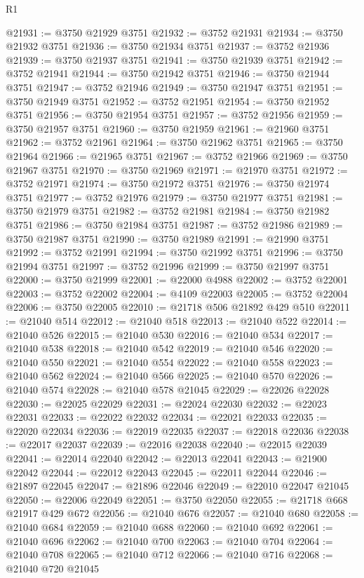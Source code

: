 \begin{lexlean}{R1}
\begin{coremodule}
@21931 := @3750 @21929 @3751
@21932 := @3752 @21931
@21934 := @3750 @21932 @3751
@21936 := @3750 @21934 @3751
@21937 := @3752 @21936
@21939 := @3750 @21937 @3751
@21941 := @3750 @21939 @3751
@21942 := @3752 @21941
@21944 := @3750 @21942 @3751
@21946 := @3750 @21944 @3751
@21947 := @3752 @21946
@21949 := @3750 @21947 @3751
@21951 := @3750 @21949 @3751
@21952 := @3752 @21951
@21954 := @3750 @21952 @3751
@21956 := @3750 @21954 @3751
@21957 := @3752 @21956
@21959 := @3750 @21957 @3751
@21960 := @3750 @21959
@21961 := @21960 @3751
@21962 := @3752 @21961
@21964 := @3750 @21962 @3751
@21965 := @3750 @21964
@21966 := @21965 @3751
@21967 := @3752 @21966
@21969 := @3750 @21967 @3751
@21970 := @3750 @21969
@21971 := @21970 @3751
@21972 := @3752 @21971
@21974 := @3750 @21972 @3751
@21976 := @3750 @21974 @3751
@21977 := @3752 @21976
@21979 := @3750 @21977 @3751
@21981 := @3750 @21979 @3751
@21982 := @3752 @21981
@21984 := @3750 @21982 @3751
@21986 := @3750 @21984 @3751
@21987 := @3752 @21986
@21989 := @3750 @21987 @3751
@21990 := @3750 @21989
@21991 := @21990 @3751
@21992 := @3752 @21991
@21994 := @3750 @21992 @3751
@21996 := @3750 @21994 @3751
@21997 := @3752 @21996
@21999 := @3750 @21997 @3751
@22000 := @3750 @21999
@22001 := @22000 @4988
@22002 := @3752 @22001
@22003 := @3752 @22002
@22004 := @4109 @22003
@22005 := @3752 @22004
@22006 := @3750 @22005
@22010 := @21718 @506 @21892 @429 @510
@22011 := @21040 @514
@22012 := @21040 @518
@22013 := @21040 @522
@22014 := @21040 @526
@22015 := @21040 @530
@22016 := @21040 @534
@22017 := @21040 @538
@22018 := @21040 @542
@22019 := @21040 @546
@22020 := @21040 @550
@22021 := @21040 @554
@22022 := @21040 @558
@22023 := @21040 @562
@22024 := @21040 @566
@22025 := @21040 @570
@22026 := @21040 @574
@22028 := @21040 @578 @21045
@22029 := @22026 @22028
@22030 := @22025 @22029
@22031 := @22024 @22030
@22032 := @22023 @22031
@22033 := @22022 @22032
@22034 := @22021 @22033
@22035 := @22020 @22034
@22036 := @22019 @22035
@22037 := @22018 @22036
@22038 := @22017 @22037
@22039 := @22016 @22038
@22040 := @22015 @22039
@22041 := @22014 @22040
@22042 := @22013 @22041
@22043 := @21900 @22042
@22044 := @22012 @22043
@22045 := @22011 @22044
@22046 := @21897 @22045
@22047 := @21896 @22046
@22049 := @22010 @22047 @21045
@22050 := @22006 @22049
@22051 := @3750 @22050
@22055 := @21718 @668 @21917 @429 @672
@22056 := @21040 @676
@22057 := @21040 @680
@22058 := @21040 @684
@22059 := @21040 @688
@22060 := @21040 @692
@22061 := @21040 @696
@22062 := @21040 @700
@22063 := @21040 @704
@22064 := @21040 @708
@22065 := @21040 @712
@22066 := @21040 @716
@22068 := @21040 @720 @21045

\end{coremodule}
\end{lexlean}
